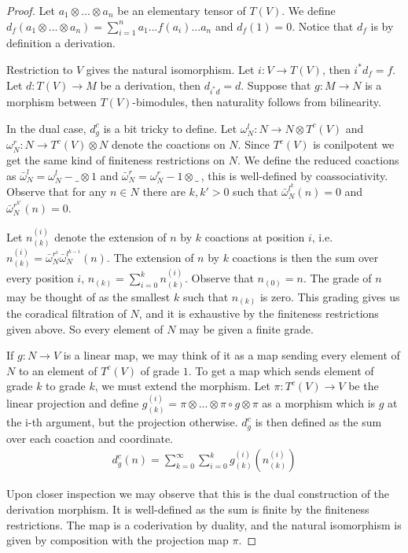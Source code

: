 \documentclass[../thesis.tex]{subfiles}
\begin{document}
            \begin{proof}
                Let $a_1\otimes ... \otimes a_n$ be an elementary tensor of $T(V)$. We define $d_f(a_1\otimes ... \otimes a_n) = \sum_{i=1}^n a_1...f(a_i)...a_n$ and $d_f(1) = 0$. Notice that $d_f$ is by definition a derivation.
                
                Restriction to $V$ gives the natural isomorphism. Let $i : V\rightarrow T(V)$, then $i^*d_f = f$. Let $d : T(V) \rightarrow M$ be a derivation, then $d_{i^*d}=d$. Suppose that $g: M \rightarrow N$ is a morphism between $T(V)$-bimodules, then naturality follows from bilinearity.

                In the dual case, $d_g^c$ is a bit tricky to define. Let $\omega^l_N:N\rightarrow N\otimes T^c(V)$ and $\omega^r_N : N\rightarrow T^c(V) \otimes N$ denote the coactions on $N$. Since $T^c(V)$ is conilpotent we get the same kind of finiteness restrictions on $N$. We define the reduced coactions as $\bar{\omega}^l_N = \omega^l_N - \_\otimes 1$ and $\bar{\omega}^r_N = \omega^r_N - 1\otimes\_\ $, this is well-defined by coassociativity. Observe that for any $n\in N$ there are $k, k'>0$ such that ${\bar{\omega}^{l^k}_N}(n) = 0$ and ${\bar{\omega}^{r^{k'}}_N}(n)=0$.

                Let $n_{(k)}^{(i)}$ denote the extension of $n$ by $k$ coactions at position $i$, i.e. $n_{(k)}^{(i)} = \bar{\omega}^{r^i}_N\bar{\omega}^{l^{k-i}}_N(n)$. The extension of $n$ by $k$ coactions is then the sum over every position $i$, $n_{(k)} = \sum_{i=0}^kn_{(k)}^{(i)}$. Observe that $n_{(0)} = n$. The grade of $n$ may be thought of as the smallest $k$ such that $n_{(k)}$ is zero. This grading gives us the coradical filtration of $N$, and it is exhaustive by the finiteness restrictions given above. So every element of $N$ may be given a finite grade.

                If $g: N \rightarrow V$ is a linear map, we may think of it as a map sending every element of $N$ to an element of $T^c(V)$ of grade $1$. To get a map which sends element of grade $k$ to grade $k$, we must extend the morphism. Let $\pi : T^c(V) \rightarrow V$ be the linear projection and define $g_{(k)}^{(i)} = \pi\otimes ... \otimes \pi \circ g \otimes \pi$ as a morphism which is $g$ at the i-th argument, but the projection otherwise. $d_g^c$ is then defined as the sum over each coaction and coordinate.
                \begin{align*}
                    d_g^c(n) = \sum_{k=0}^\infty \sum_{i=0}^k g_{(k)}^{(i)}(n_{(k)}^{(i)})
                \end{align*}
                
                Upon closer inspection we may observe that this is the dual construction of the derivation morphism. It is well-defined as the sum is finite by the finiteness restrictions. The map is a coderivation by duality, and the natural isomorphism is given by composition with the projection map $\pi$.
            \end{proof}
\end{document}
